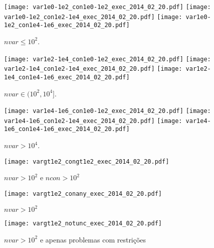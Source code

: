 \documentclass{article}
\begin{document}
\begin{figure}[H]
\centering
\texttt{[image: var1e0-1e2\_con1e0-1e2\_exec\_2014\_02\_20.pdf]}
\texttt{[image: var1e0-1e2\_con1e2-1e4\_exec\_2014\_02\_20.pdf]}
\texttt{[image: var1e0-1e2\_con1e4-1e6\_exec\_2014\_02\_20.pdf]}
\caption{ $nvar \leq 10^2$. }
\label{fig:nvar_small}
\end{figure}
\begin{figure}[H]
\centering
\texttt{[image: var1e2-1e4\_con1e0-1e2\_exec\_2014\_02\_20.pdf]}
\texttt{[image: var1e2-1e4\_con1e2-1e4\_exec\_2014\_02\_20.pdf]}
\texttt{[image: var1e2-1e4\_con1e4-1e6\_exec\_2014\_02\_20.pdf]}
\caption{ $nvar \in (10^2,10^4]$. }
\label{fig:nvar_medium}
\end{figure}
\begin{figure}[H]
\centering
\texttt{[image: var1e4-1e6\_con1e0-1e2\_exec\_2014\_02\_20.pdf]}
\texttt{[image: var1e4-1e6\_con1e2-1e4\_exec\_2014\_02\_20.pdf]}
\texttt{[image: var1e4-1e6\_con1e4-1e6\_exec\_2014\_02\_20.pdf]}
\caption{ $nvar > 10^4$. }
\label{fig:nvar_big}
\end{figure}

\begin{figure}[H]
\centering
\texttt{[image: vargt1e2\_congt1e2\_exec\_2014\_02\_20.pdf]}
\caption{ $nvar > 10^2$ e $ncon > 10^2$ }
\label{fig:both_medium_and_big}
\end{figure}

\begin{figure}[H]
\centering
\texttt{[image: vargt1e2\_conany\_exec\_2014\_02\_20.pdf]}
\caption{ $nvar > 10^2$ }
\label{fig:nvar_medium_and_big}
\end{figure}

\begin{figure}[H]
\centering
\texttt{[image: vargt1e2\_notunc\_exec\_2014\_02\_20.pdf]}
\caption{ $nvar > 10^2$ e apenas problemas com restrições }
\label{fig:nvar_medium_and_big_not_unc}
\end{figure}
\end{document}
